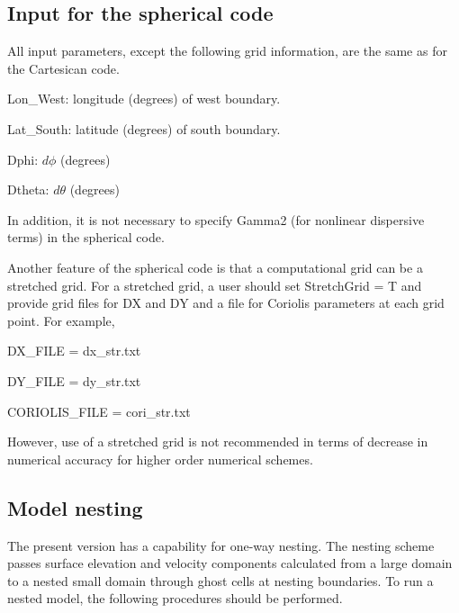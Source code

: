 \documentclass[11pt]{article}
\begin{document}
\subsection{Input for the spherical code}

All input parameters, except the following grid information, are the same as for the Cartesican code.

\begin{description}

\item Lon\_West: longitude (degrees) of west boundary.
\item Lat\_South: latitude (degrees) of south boundary.
\item Dphi: $d\phi$ (degrees)
\item Dtheta: $d\theta$ (degrees) 

\end{description}

In addition, it is not necessary to specify  Gamma2 (for nonlinear dispersive terms) in the spherical code.  

Another feature of the spherical code is that a computational grid can be a stretched grid. For a stretched grid, a user should set  StretchGrid = T and provide grid files for DX and DY and a file for Coriolis parameters at each grid point.  For example,

DX\_FILE = dx\_str.txt

DY\_FILE = dy\_str.txt

CORIOLIS\_FILE = cori\_str.txt

However, use of a stretched grid is not recommended in terms of decrease in numerical accuracy for  higher order numerical schemes. 

\subsection{Model nesting}

The present version has a capability for one-way nesting. The nesting scheme passes surface elevation and velocity components calculated from a large domain to a nested small domain through ghost cells at nesting boundaries. To run a nested model, the following procedures should be performed.
\end{document}
